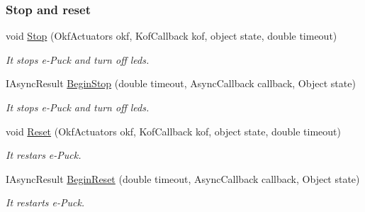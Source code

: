 \subsubsection*{Stop and reset} %
\label{ssub:Stop and reset}
  \begin{DoxyCompactItemize}

  \item void \hyperlink{class_elib_1_1_epuck_a6c5b0e61b183ae36e78251e51e32bdd3}{Stop} (OkfActuators okf, KofCallback kof, object state, double timeout)
  \begin{DoxyCompactList}\small\item\em It stops e-\/Puck and turn off leds. \item\end{DoxyCompactList}

  \item   IAsyncResult \hyperlink{class_elib_1_1_epuck_a4b66f73064942aa5736dca815a427d01}{BeginStop} (double timeout, AsyncCallback callback, Object state)
  \begin{DoxyCompactList}\small\item\em It stops e-\/Puck and turn off leds. \item\end{DoxyCompactList}

  \item void \hyperlink{class_elib_1_1_epuck_a36714362701622796cf01480ea4f8d32}{Reset} (OkfActuators okf, KofCallback kof, object state, double timeout)
  \begin{DoxyCompactList}\small\item\em It restars e-\/Puck. \item\end{DoxyCompactList}

  \item   IAsyncResult \hyperlink{class_elib_1_1_epuck_a2b73b814db861ed276587db2fc124244}{BeginReset} (double timeout, AsyncCallback callback, Object state)
  \begin{DoxyCompactList}\small\item\em It restarts e-\/Puck. \item\end{DoxyCompactList} 

  \end{DoxyCompactItemize}

